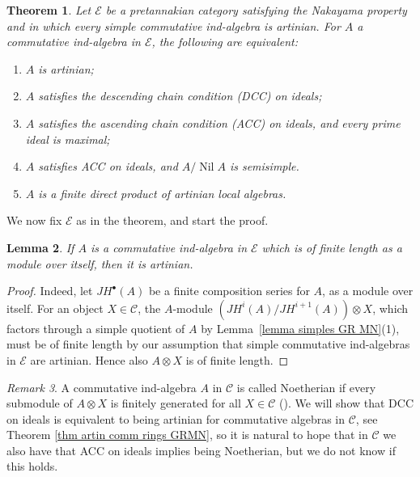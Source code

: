 \documentclass[11pt]{amsart}
\def\Cs{\mathscr{C}}
\def\Es{\mathscr{E}}
\newtheorem{thm}{Theorem}[section]
\newtheorem{lemma}[thm]{Lemma}
\theoremstyle{definition}
\theoremstyle{remark}
\newtheorem{remark}[thm]{Remark}
\numberwithin{equation}{section}
\begin{document}
\begin{thm}\label{thm:artinianv2} Let $\Es$ be a pretannakian category satisfying the Nakayama property and in which every simple commutative ind-algebra is artinian. 
    For $A$ a commutative ind-algebra in $\Es$, the following are equivalent:
    \begin{enumerate}
        \item $A$ is artinian;
        \item $A$ satisfies the descending chain condition (DCC) on ideals;
        \item $A$ satisfies the ascending chain condition (ACC) on ideals, and every prime ideal is maximal;
        \item $A$ satisfies ACC on ideals, and $A/\operatorname{Nil}A$ is semisimple.
        \item $A$ is a finite direct product of artinian local algebras.
    \end{enumerate}
\end{thm}


We now fix $\Es$ as in the theorem, and start the proof.



\begin{lemma}\label{cor finite lenght implies artinian}
    If $A$ is a commutative ind-algebra in $\Es$ which is of finite length as a module over itself, then it is artinian.
\end{lemma}



\begin{proof}
    Indeed, let $JH^\bullet(A)$ be a finite composition series  for $A$, as a module over itself. For an object $X\in\Cs$, the $A$-module $(JH^i(A)/JH^{i+1}(A))\otimes X$, which factors through a simple quotient of $A$ by Lemma~\ref{lemma simples GR MN}(1), must be of finite length by our assumption that simple commutative ind-algebras in $\Es$ are artinian. Hence also $A\otimes X$ is of finite length.
\end{proof}



\begin{remark}
    A commutative ind-algebra $A$ in $\Cs$ is called Noetherian if every submodule of $A\otimes X$ is finitely generated for all $X\in\Cs$ (\cite[\S 6.4]{C1}). We will show that DCC on ideals is equivalent to being artinian for commutative algebras in $\Cs$, see Theorem \ref{thm artin comm rings GRMN}, so it is natural to hope that in $\Cs$ we also have that ACC on ideals implies being Noetherian, but we do not know if this holds.
\end{remark}
\end{document}
